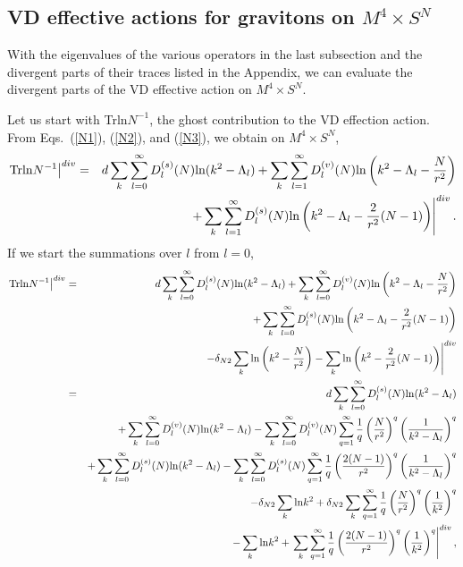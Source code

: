 \documentclass[a4paper,aps,preprint,groupedaddress,showpacs]{revtex4}
\begin{document}
\subsection{VD effective actions for
	    gravitons on $M^{4}\times S^{N}$}

With the eigenvalues of the various operators in the last
subsection and the divergent parts of their traces listed
in the Appendix, we can evaluate the divergent parts of the
VD effective action on $M^{4}\times S^{N}$. 

Let us start with Trln$N^{-1}$, the ghost contribution to the 
VD effection action. From Eqs.~(\ref{N1}), (\ref{N2}), and 
(\ref{N3}), we obtain on
$M^{4}\times S^{N}$,
\begin{eqnarray}
\left.{\rm Trln}N^{-1}\right\vert^{div}
&=&d\sum_{k}\sum^{\infty}_{l=0}D^{(s)}_{l}(N)
{\rm ln}(k^{2}-\Lambda_{l})+
\sum_{k}\sum^{\infty}_{l=1}D^{(v)}_{l}(N)
{\rm ln}\left(k^{2}-\Lambda_{l}-\frac{N}{r^{2}}\right)
\nonumber\\
&&\ \ \left.+\sum_{k}\sum^{\infty}_{l=1}D^{(s)}_{l}(N)
{\rm ln}\left(k^{2}-\Lambda_{l}-\frac{2}{r^{2}}(N-1)\right)
\right\vert^{div}.
\end{eqnarray}
If we start the summations over $l$ from $l=0$, 
\begin{eqnarray}
\left.{\rm Trln}N^{-1}\right\vert^{div}
&=&d\sum_{k}\sum^{\infty}_{l=0}D^{(s)}_{l}(N)
{\rm ln}(k^{2}-\Lambda_{l})+
\sum_{k}\sum^{\infty}_{l=0}D^{(v)}_{l}(N)
{\rm ln}\left(k^{2}-\Lambda_{l}-\frac{N}{r^{2}}\right)
\nonumber\\
&&\ \ +\sum_{k}\sum^{\infty}_{l=0}D^{(s)}_{l}(N)
{\rm ln}\left(k^{2}-\Lambda_{l}-\frac{2}{r^{2}}(N-1)\right)
\nonumber\\
&&\left.-\delta_{N2}\sum_{k}
{\rm ln}\left(k^{2}-\frac{N}{r^{2}}\right)-
\sum_{k}{\rm ln}\left(k^{2}-\frac{2}{r^{2}}(N-1)\right)
\right\vert^{div}
\nonumber\\
&=&d\sum_{k}\sum^{\infty}_{l=0}D^{(s)}_{l}(N)
{\rm ln}(k^{2}-\Lambda_{l})
\nonumber\\
&&\ \ +\sum_{k}\sum^{\infty}_{l=0}D^{(v)}_{l}(N)
{\rm ln}(k^{2}-\Lambda_{l})
-\sum_{k}\sum^{\infty}_{l=0}D^{(v)}_{l}(N)
\sum^{\infty}_{q=1}\frac{1}{q}\left(\frac{N}{r^{2}}\right)^{q}
\left(\frac{1}{k^{2}-\Lambda_{l}}\right)^{q}
\nonumber\\
&&+\sum_{k}\sum^{\infty}_{l=0}D^{(s)}_{l}(N)
{\rm ln}(k^{2}-\Lambda_{l})-
\sum_{k}\sum^{\infty}_{l=0}D^{(s)}_{l}(N)
\sum^{\infty}_{q=1}\frac{1}{q}
\left(\frac{2(N-1)}{r^{2}}\right)^{q}
\left(\frac{1}{k^{2}-\Lambda_{l}}\right)^{q}
\nonumber\\
&&-\delta_{N2}\sum_{k}{\rm ln}k^{2}+
\delta_{N2}\sum_{k}\sum^{\infty}_{q=1}\frac{1}{q}
\left(\frac{N}{r^{2}}\right)^{q}
\left(\frac{1}{k^{2}}\right)^{q}
\nonumber\\
&&-\sum_{k}{\rm ln}k^{2}+\left.\sum_{k}\sum^{\infty}_{q=1}
\frac{1}{q}\left(\frac{2(N-1)}{r^{2}}\right)^{q}
\left(\frac{1}{k^{2}}\right)^{q}\right\vert^{div},
\end{eqnarray}
\end{document}
